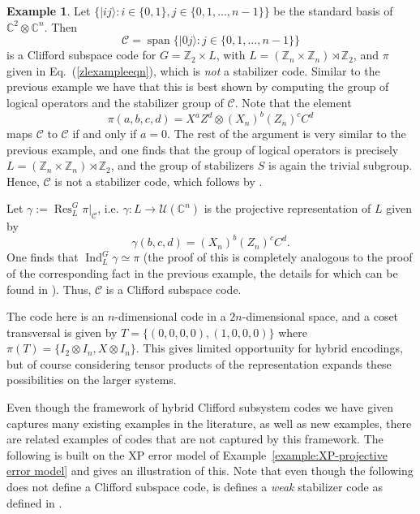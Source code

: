 \documentclass[11pt]{article}
\theoremstyle{definition}
\newtheorem{example}{Example}
\def\ket#1{| #1 \rangle}
\newcommand{\bbC}{\mathbb{C}}
\newcommand{\bbZ}{\mathbb{Z}}
\newcommand{\calC}{\mathcal{C}}
\newcommand{\calU}{\mathcal{U}}
\newcommand{\Ind}{\operatorname{Ind}}
\newcommand{\Res}{\operatorname{Res}}
\newcommand{\Span}{\operatorname{span}}
\begin{document}
\begin{example}
    Let $\{\ket{ij} : i \in \{0,1\}, j \in \{0,1,...,n-1\}\}$ be the standard basis of $\bbC^2 \otimes \bbC^n$. Then
    \begin{equation*}
        \calC = \Span\{ \ket{0j} : j \in \{0,1,...,n-1\}\}
    \end{equation*}
    is a Clifford subspace code for $G = \mathbb Z_2 \times L$, with $L = (\bbZ_n \times \bbZ_n) \rtimes \bbZ_2$, and $\pi$ given in Eq.~(\ref{zlexampleeqn}), which is \emph{not} a stabilizer code. Similar to the previous example we have that this is best shown by computing the group of logical operators and the stabilizer group of $\calC$. Note that the element
    \[
        \pi(a,b,c,d) = X^a Z^d \otimes (X_n)^b (Z_n)^c C^d
    \]
    maps $\calC$ to $\calC$ if and only if $a=0$. The rest of the argument is very similar to the previous example, and one finds that the group of logical operators is precisely $L = (\bbZ_n \times \bbZ_n) \rtimes \bbZ_2$, and the group of stabilizers $S$ is again the trivial subgroup. Hence, $\calC$ is not a stabilizer code, which follows by \cite[Proposition 6.7]{Eidesen2025}. 

    Let $\gamma := \Res^G_L\pi|_\calC$, i.e. $\gamma \colon L \to \calU(\bbC^n)$ is the projective representation of $L$ given by
    \begin{equation*}
        \gamma(b,c,d) = (X_n)^b(Z_n)^cC^d.
    \end{equation*}
    One finds that $\Ind_L^G\gamma \simeq \pi$ (the proof of this is completely analogous to the proof of the corresponding fact in the previous example, the details for which can be found in \cite[Proposition 8.1]{Eidesen2025}). Thus, $\calC$ is a Clifford subspace code.

    The code here is an $n$-dimensional code in a $2n$-dimensional space, and a coset transversal is given by $T = \{(0,0,0,0),(1,0,0,0)\}$ where $\pi(T) = \{ I_{2} \otimes I_{n}, X\otimes I_n \}$. This gives limited opportunity for hybrid encodings, but of course considering tensor products of the representation expands these possibilities on the larger systems.  
\end{example}

Even though the framework of hybrid Clifford subsystem codes we have given captures many existing examples in the literature, as well as new examples, there are related examples of codes that are not captured by this framework. The following is built on the XP error model of Example~\ref{example:XP-projective error model} and gives an illustration of this. Note that even though the following does not define a Clifford subspace code, is defines a \emph{weak} stabilizer code as defined in \cite[Definition 5.2]{Eidesen2025}.
\end{document}
